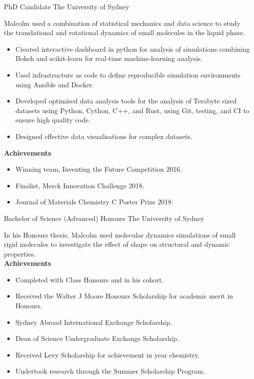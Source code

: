 {PhD Candidate}
{The University of Sydney}{}{}
{%
  Malcolm used a combination of statistical mechanics and data science to
  study the translational and rotational dynamics
  of small molecules in the liquid phase.
\begin{itemize}
  \item Created interactive dashboard in python for analysis of simulations
    combining Bokeh and scikit-learn for real-time machine-learning analysis.
  \item Used infrastructure as code to define reproducible simulation environments
    using Ansible and Docker.
  \item Developed optimised data analysis tools for the analysis of Terabyte sized
    datasets using Python, Cython, C++, and Rust,
    using Git, testing, and CI to ensure high quality code.
  \item Designed effective data visualisations for complex datasets.
\end{itemize}
\textbf{Achievements}
\begin{itemize}
  \item Winning team, Inventing the Future Competition 2016.
  \item Finalist, Merck Innovation Challenge 2018.
  \item Journal of Materials Chemistry C Poster Prize 2018.
\end{itemize}
}

{Bachelor of Science (Advanced) Honours}
{The University of Sydney}{}{}
{%
  In his Honours thesis,
  Malcolm used molecular dynamics simulations of small rigid molecules
  to investigate the effect of shape on structural and dynamic properties.\\
\textbf{Achievements}
\begin{itemize}
  \item Completed with  Class Honours and  in his cohort.
  \item Received the Walter J Moore Honours Scholarship for academic merit in Honours.
  \item Sydney Abroad International Exchange Scholarship.
  \item Dean of Science Undergraduate Exchange Scholarship.
  \item Received Levy Scholarship for achievement in  year chemistry.
  \item Undertook research through the Summer Scholarship Program.
\end{itemize}
}

